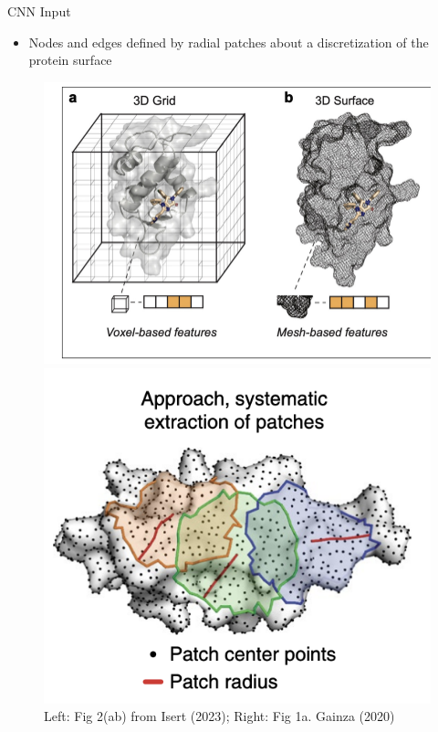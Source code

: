 \documentclass{beamer}
\begin{document}
\begin{frame}{CNN Input}
    \begin{itemize}
        \item Nodes and edges defined by radial patches about a discretization of the protein surface 
    \end{itemize}

    \begin{figure}
        \centering 
        \includegraphics[scale=0.4]{Isert_2023_ModelsSBDD_VoxelMesh.png}
%
        \includegraphics[scale=0.5]{Gainza_2020_ProteinNodesRadii.png}  \\ 
        Left: Fig 2(ab) from Isert (2023); Right: Fig 1a. Gainza (2020) \cite{isert_structure-based_2023, gainza_deciphering_2020}
    \end{figure}
\end{frame}
\end{document}
